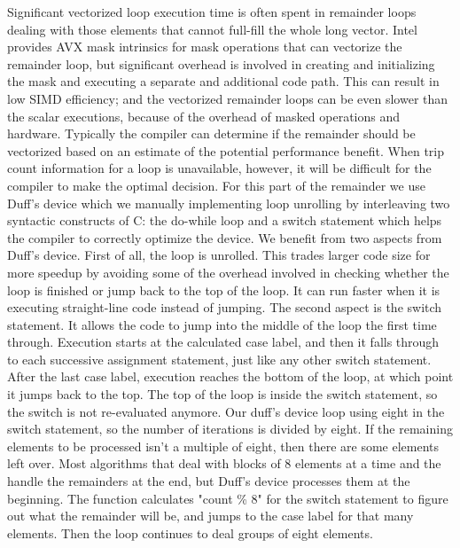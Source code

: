 \documentclass[sigconf,review]{acmart}
\begin{document}
Significant vectorized loop execution time is often spent in remainder
loops dealing with those elements that cannot full-fill the whole long vector.
Intel provides AVX mask intrinsics for mask operations that can vectorize the remainder loop,
but significant overhead is involved in creating and initializing the mask and executing a separate and additional code path.
This can result in low SIMD efficiency; and the vectorized remainder loops can be
even slower than the scalar executions, because of the overhead of
masked operations and hardware. Typically
the compiler can determine if the remainder should be vectorized
based on an estimate of the potential performance benefit. When trip count information for a
loop is unavailable, however, it will be difficult for the
compiler to make the optimal decision.
For this part of the remainder we use Duff's device which we manually implementing loop unrolling by interleaving two syntactic constructs of C: the do-while loop and a switch statement which helps the compiler to correctly optimize the device.
We benefit from two aspects from Duff's device. First of all, the loop is unrolled.
This trades larger code size for more speedup by avoiding some of the overhead
involved in checking whether the loop is finished or jump back to the
top of the loop. It can run faster when it is executing straight-line code instead of jumping.
The second aspect is the switch statement. It allows the code to jump into the middle of the
loop the first time through.
Execution starts at the calculated case label, and then it falls through to each successive
assignment statement, just like any other switch statement. After the last case label, execution reaches the bottom of the loop, at which point it jumps back to the top. The top of the loop is inside the switch statement, so the switch is not re-evaluated anymore.
Our duff's device loop using eight in the switch statement, so the number of iterations is divided by eight.
If the remaining elements to be processed isn't a multiple of eight, then there are some elements left over.
Most algorithms that deal with blocks of 8 elements at a time and the handle the remainders at the end,
but Duff's device processes them at the beginning. The function calculates "count \% 8" for the switch statement to figure out what the remainder will be, and jumps to the case label for that many elements. Then the loop continues to deal groups of eight elements.
\end{document}

